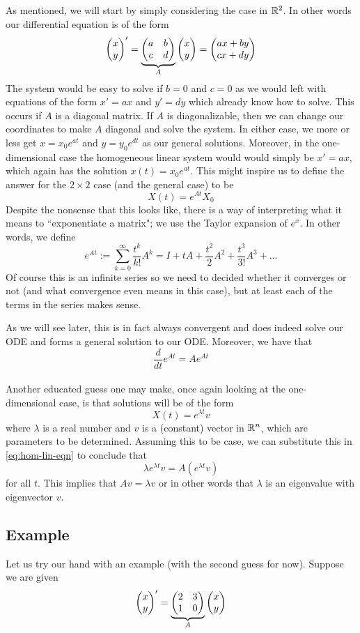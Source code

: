 As mentioned, we will start by simply considering the case in $\mathbb{R}^2$. In other words our differential equation is of the form
\begin{equation}\label{eq:hom-lin-eqn}
    \begin{pmatrix} x \\ y \end{pmatrix}' = \underbrace{\begin{pmatrix} a & b\\c & d \end{pmatrix}}_{A} \begin{pmatrix} x \\ y \end{pmatrix} = \begin{pmatrix} ax + by \\ cx + dy \end{pmatrix}
\end{equation}
The system would be easy to solve if $b = 0$ and $c = 0$ as we would left with equations of the form $x' = ax$ and $y' = dy$ which already know how to solve. This occurs if $A$ is a diagonal matrix. If $A$ is diagonalizable, then we can change our coordinates to make $A$ diagonal and solve the system. In either case, we more or less get $x = x_0 e^{at}$ and $y = y_0 e^{dt}$ as our general solutions. Moreover, in the one-dimensional case the homogeneous linear system would would simply be $x' = ax$, which again has the solution $x(t) = x_0 e^{at}$. This might inspire us to define the answer for the $2 \times 2$ case (and the general case) to be
$$ X(t) = e^{At} X_0 $$
Despite the nonsense that this looks like, there is a way of interpreting what it means to ``exponentiate a matrix"; we use the Taylor expansion of $e^x$. In other words, we define
$$ e^{At} := \sum_{k = 0}^{\infty} \frac{t^k}{k!} A^k = I + tA + \frac{t^2}{2}A^2 + \frac{t^3}{3!} A^3 + \dots $$
Of course this is an infinite series so we need to decided whether it converges or not (and what convergence even means in this case), but at least each of the terms in the series makes sense.

As we will see later, this is in fact always convergent and does indeed solve our ODE and forms a general solution to our ODE. Moreover, we have that
$$ \frac{d}{dt} e^{At} = A e^{At} $$
\\
Another educated guess one may make, once again looking at the one-dimensional case, is that solutions will be of the form
$$ X(t) = e^{\lambda t} v $$
where $\lambda$ is a real number and $v$ is a (constant) vector in $\mathbb{R}^n$, which are parameters to be determined. Assuming this to be case, we can substitute this in \autoref{eq:hom-lin-eqn} to conclude that
$$ \lambda e^{\lambda t} v = A (e^{\lambda t} v) $$
for all $t$.
This implies that $Av = \lambda v$ or in other words that $\lambda$ is an eigenvalue with eigenvector $v$.

\subsection{Example}\label{subsec:linear-example}
Let us try our hand with an example (with the second guess for now).
Suppose we are given
\begin{equation}\label{eq:lin-eqn-eg}
    \begin{pmatrix} x\\y \end{pmatrix}' = \underbrace{\begin{pmatrix} 2 & 3\\1 & 0 \end{pmatrix}}_{A} \begin{pmatrix} x\\y \end{pmatrix}
\end{equation}

